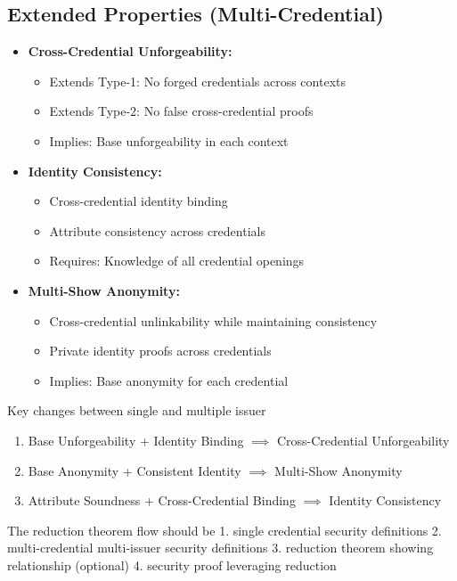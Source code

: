 \subsection{Extended Properties (Multi-Credential)}
\begin{itemize}
    \item \textbf{Cross-Credential Unforgeability:}
    \begin{itemize}
        \item Extends Type-1: No forged credentials across contexts
        \item Extends Type-2: No false cross-credential proofs
        \item Implies: Base unforgeability in each context
    \end{itemize}

    \item \textbf{Identity Consistency:}
    \begin{itemize}
        \item Cross-credential identity binding
        \item Attribute consistency across credentials
        \item Requires: Knowledge of all credential openings
    \end{itemize}

    \item \textbf{Multi-Show Anonymity:}
    \begin{itemize}
        \item Cross-credential unlinkability while maintaining consistency
        \item Private identity proofs across credentials
        \item Implies: Base anonymity for each credential
    \end{itemize}
\end{itemize}

Key changes between single and multiple issuer
\begin{enumerate}
    \item Base Unforgeability + Identity Binding $\implies$ Cross-Credential Unforgeability
    \item Base Anonymity + Consistent Identity $\implies$  Multi-Show Anonymity
    \item Attribute Soundness + Cross-Credential Binding $\implies$ Identity Consistency
\end{enumerate}


The reduction theorem flow should be 
1. single credential security definitions
2. multi-credential multi-issuer security definitions
3. reduction theorem showing relationship (optional)
4. security proof leveraging reduction 



